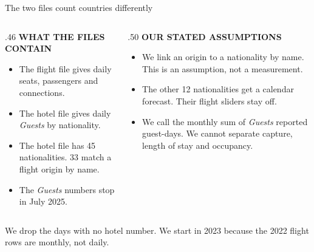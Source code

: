 \documentclass[aspectratio=169,10pt]{beamer}
\newcommand{\kicker}[1]{{\color{Accent}\scriptsize\bfseries\MakeUppercase{#1}}\par\vspace{.16cm}}
\newcommand{\smallnote}[1]{{\color{Muted}\scriptsize #1}}
\begin{document}
\begin{frame}{The two files count countries differently}
  \begin{columns}[T,totalwidth=\linewidth]
    \begin{column}{.46\linewidth}
      \kicker{What the files contain}
      \begin{itemize}\setlength\itemsep{.14cm}
        \item The flight file gives daily seats, passengers and connections.
        \item The hotel file gives daily \emph{Guests} by nationality.
        \item The hotel file has 45 nationalities. 33 match a flight origin by name.
        \item The \emph{Guests} numbers stop in July 2025.
      \end{itemize}
    \end{column}
    \begin{column}{.50\linewidth}
      \kicker{Our stated assumptions}
      \begin{itemize}\setlength\itemsep{.14cm}
        \item We link an origin to a nationality by name. This is an assumption, not a measurement.
        \item The other 12 nationalities get a calendar forecast. Their flight sliders stay off.
        \item We call the monthly sum of \emph{Guests} reported guest-days. We cannot separate capture, length of stay and occupancy.
      \end{itemize}
    \end{column}
  \end{columns}
  \vspace{.18cm}
  \smallnote{We drop the days with no hotel number. We start in 2023 because the 2022 flight rows are monthly, not daily.}
\end{frame}
\end{document}
